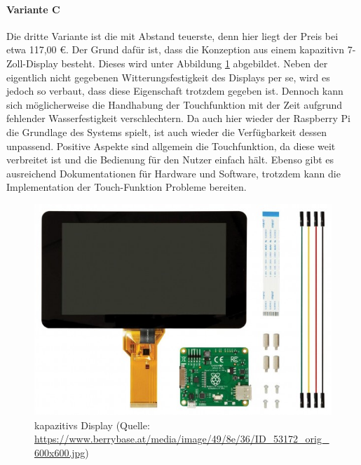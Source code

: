 \paragraph{Variante C}
Die dritte Variante ist die mit Abstand teuerste, denn hier liegt der Preis bei etwa 117,00 €. Der Grund dafür ist, dass die Konzeption aus einem \gls{kapazitiv}n 7-Zoll-Display besteht. Dieses wird unter Abbildung \ref{fig:kapazitives_display} abgebildet. Neben der eigentlich nicht gegebenen Witterungsfestigkeit des Displays per se, wird es jedoch so verbaut, dass diese Eigenschaft trotzdem gegeben ist. Dennoch kann sich möglicherweise die Handhabung der Touchfunktion mit der Zeit aufgrund fehlender Wasserfestigkeit verschlechtern. Da auch hier wieder der Raspberry Pi die Grundlage des Systems spielt, ist auch wieder die Verfügbarkeit dessen unpassend. Positive Aspekte sind allgemein die Touchfunktion, da diese weit verbreitet ist und die Bedienung für den Nutzer einfach hält. Ebenso gibt es ausreichend Dokumentationen für Hardware und Software, trotzdem kann die Implementation der Touch-Funktion Probleme bereiten.
\begin{figure}[ht]
	\centering
	\includegraphics[width=0.6\linewidth]{Bilder/kapazitives_display.jpg}
	\caption{\gls{kapazitiv}s Display (Quelle: \url{https://www.berrybase.at/media/image/49/8e/36/ID_53172_orig_600x600.jpg})}
	\label{fig:kapazitives_display}
\end{figure}
\newpage
